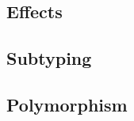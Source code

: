 \documentclass[a4paper, 12pt]{report}
\newcommand{\+}{\enspace}
\begin{document}
\subsection{Effects}

\subsection{Subtyping}

\subsection{Polymorphism}



\end{document}
